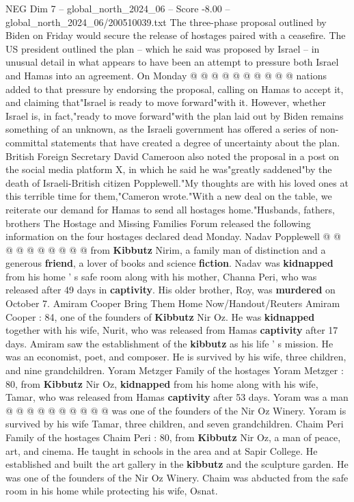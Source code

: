 \begin{textsample}{NEG Dim 7 – global\_north\_2024\_06 – Score -8.00 – global\_north\_2024\_06/200510039.txt}
The three-phase proposal outlined by Biden on Friday would secure the release of hostages paired with a ceasefire.
The US president outlined the plan -- which he said was proposed by Israel -- in unusual detail in what appears to have been an attempt to pressure both Israel and Hamas into an agreement.
On Monday @ @ @ @ @ @ @ @ @ @ nations added to that pressure by endorsing the proposal, calling on Hamas to accept it, and claiming that"Israel is ready to move forward"with it.
However, whether Israel is, in fact,"ready to move forward"with the plan laid out by Biden remains something of an unknown, as the Israeli government has offered a series of non-committal statements that have created a degree of uncertainty about the plan.
British Foreign Secretary David Cameroon also noted the proposal in a post on the social media platform X, in which he said he was"greatly saddened"by the death of Israeli-British citizen Popplewell."My thoughts are with his loved ones at this terrible time for them,"Cameron wrote."With a new deal on the table, we reiterate our demand for Hamas to send all hostages home."Husbands, fathers, brothers The Hostage and Missing Families Forum released the following information on the four hostages declared dead Monday.
Nadav Popplewell @ @ @ @ @ @ @ @ @ @ from \textbf{Kibbutz} Nirim, a family man of distinction and a generous \textbf{friend}, a lover of books and science \textbf{fiction}.
Nadav was \textbf{kidnapped} from his home ' s safe room along with his mother, Channa Peri, who was released after 49 days in \textbf{captivity}.
His older brother, Roy, was \textbf{murdered} on October 7.
Amiram Cooper Bring Them Home Now/Handout/Reuters Amiram Cooper : 84, one of the founders of \textbf{Kibbutz} Nir Oz.
He was \textbf{kidnapped} together with his wife, Nurit, who was released from Hamas \textbf{captivity} after 17 days.
Amiram saw the establishment of the \textbf{kibbutz} as his life ' s mission.
He was an economist, poet, and composer.
He is survived by his wife, three children, and nine grandchildren.
Yoram Metzger Family of the hostages Yoram Metzger : 80, from \textbf{Kibbutz} Nir Oz, \textbf{kidnapped} from his home along with his wife, Tamar, who was released from Hamas \textbf{captivity} after 53 days.
Yoram was a man @ @ @ @ @ @ @ @ @ @ was one of the founders of the Nir Oz Winery.
Yoram is survived by his wife Tamar, three children, and seven grandchildren.
Chaim Peri Family of the hostages Chaim Peri : 80, from \textbf{Kibbutz} Nir Oz, a man of peace, art, and cinema.
He taught in schools in the area and at Sapir College.
He established and built the art gallery in the \textbf{kibbutz} and the sculpture garden.
He was one of the founders of the Nir Oz Winery.
Chaim was abducted from the safe room in his home while protecting his wife, Osnat.

\end{textsample}
